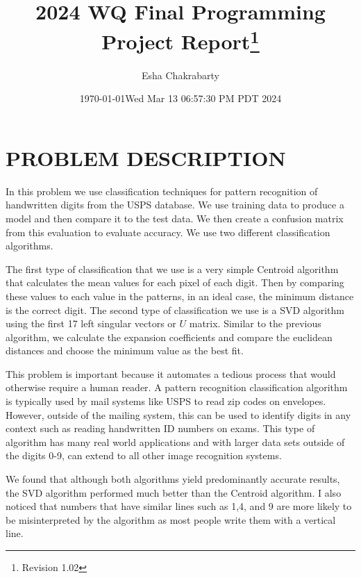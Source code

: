 \documentclass[dvipsnames,12pt]{article} %
\title{2024 WQ Final Programming Project Report\footnote{Revision 1.02}}
\author{Esha Chakrabarty} %
\date{\today}
\date{Wed Mar 13 06:57:30 PM PDT 2024}
\begin{document}
\maketitle
\tableofcontents
\newpage

  \section{PROBLEM DESCRIPTION}
    \label{SECT 01:PROBLEM DESCRIPTION}

      \vspace{12pt}

      In this problem we use classification techniques for pattern recognition of handwritten digits from the USPS database. We use training data to produce a model and then compare it to the test data. We then create a confusion matrix from this evaluation to evaluate accuracy. We use two different classification algorithms.

      \vspace{12pt}
The first type of classification that we use is a very simple Centroid algorithm that calculates the mean values for each pixel of each digit. Then by comparing these values to each value in the patterns, in an ideal case, the minimum distance is the correct digit. The second type of classification we use is a SVD algorithm using the first 17 left singular vectors or $U$ matrix. Similar to the previous algorithm, we calculate the expansion coefficients and compare the euclidean distances and choose the minimum value as the best fit.
      
      \vspace{12pt}
This problem is important because it automates a tedious process that would otherwise require a human reader. A pattern recognition classification algorithm is typically used by mail systems like USPS to read zip codes on envelopes. However, outside of the mailing system, this can be used to identify digits in any context such as reading handwritten ID numbers on exams. This type of algorithm has many real world applications and with larger data sets outside of the digits 0-9, can extend to all other image recognition systems.
      
      \vspace{12pt}
      
We found that although both algorithms yield predominantly accurate results, the SVD algorithm performed much better than the Centroid algorithm. I also noticed that numbers that have similar lines such as 1,4, and 9 are more likely to be misinterpreted by the algorithm as most people write them with a vertical line.
\end{document}
